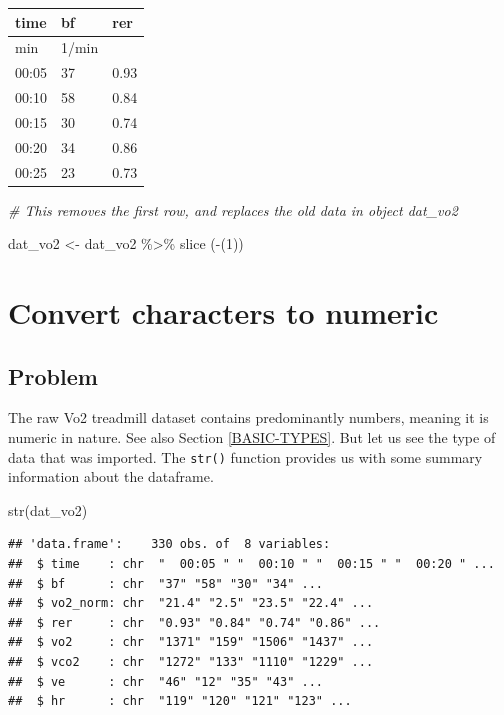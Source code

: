 \documentclass[
]{book}
\newenvironment{Shaded}{\begin{snugshade}}{\end{snugshade}}
\newcommand{\CommentTok}[1]{\textcolor[rgb]{0.56,0.35,0.01}{\textit{#1}}}
\newcommand{\DecValTok}[1]{\textcolor[rgb]{0.00,0.00,0.81}{#1}}
\newcommand{\FunctionTok}[1]{\textcolor[rgb]{0.00,0.00,0.00}{#1}}
\newcommand{\NormalTok}[1]{#1}
\newcommand{\OtherTok}[1]{\textcolor[rgb]{0.56,0.35,0.01}{#1}}
\newcommand{\SpecialCharTok}[1]{\textcolor[rgb]{0.00,0.00,0.00}{#1}}
\begin{document}
\begin{tabular}{l|l|l}
\hline
time & bf & rer\\
\hline
min & 1/min & \\
\hline
00:05 & 37 & 0.93\\
\hline
00:10 & 58 & 0.84\\
\hline
00:15 & 30 & 0.74\\
\hline
00:20 & 34 & 0.86\\
\hline
00:25 & 23 & 0.73\\
\hline
\end{tabular}

\begin{Shaded}
\begin{Highlighting}[]
\CommentTok{\# This removes the first row, and replaces the old data in object dat\_vo2}

\NormalTok{dat\_vo2 }\OtherTok{\textless{}{-}}\NormalTok{ dat\_vo2 }\SpecialCharTok{\%\textgreater{}\%} 
  \FunctionTok{slice}\NormalTok{ (}\SpecialCharTok{{-}}\NormalTok{(}\DecValTok{1}\NormalTok{))}
\end{Highlighting}
\end{Shaded}

\hypertarget{WRANGLE-CHARACTER-2-NUMERIC}{%
\section{Convert characters to numeric}\label{WRANGLE-CHARACTER-2-NUMERIC}}

\hypertarget{problem-2}{%
\subsection{Problem}\label{problem-2}}

The raw Vo2 treadmill dataset contains predominantly numbers, meaning it is numeric in nature. See also Section \ref{BASIC-TYPES}. But let us see the type of data that was imported. The \texttt{str()} function provides us with some summary information about the dataframe.

\begin{Shaded}
\begin{Highlighting}[]
\FunctionTok{str}\NormalTok{(dat\_vo2)}
\end{Highlighting}
\end{Shaded}

\begin{verbatim}
## 'data.frame':    330 obs. of  8 variables:
##  $ time    : chr  "  00:05 " "  00:10 " "  00:15 " "  00:20 " ...
##  $ bf      : chr  "37" "58" "30" "34" ...
##  $ vo2_norm: chr  "21.4" "2.5" "23.5" "22.4" ...
##  $ rer     : chr  "0.93" "0.84" "0.74" "0.86" ...
##  $ vo2     : chr  "1371" "159" "1506" "1437" ...
##  $ vco2    : chr  "1272" "133" "1110" "1229" ...
##  $ ve      : chr  "46" "12" "35" "43" ...
##  $ hr      : chr  "119" "120" "121" "123" ...
\end{verbatim}
\end{document}
